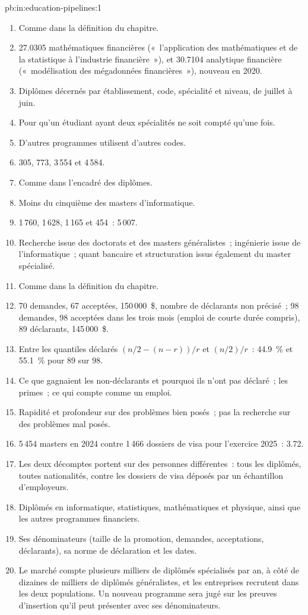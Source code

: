 \begin{solution}{pb:in:education-pipelines:1}
\begin{enumerate}
\item Comme dans la définition du chapitre.
\item 27.0305 mathématiques financières («~l'application des mathématiques et de la statistique à l'industrie financière~»), et
30.7104 analytique financière («~modélisation des mégadonnées financières~»), nouveau en 2020.
\item Diplômes décernés par établissement, code, spécialité et niveau, de juillet à juin.
\item Pour qu'un étudiant ayant deux spécialités ne soit compté qu'une fois.
\item D'autres programmes utilisent d'autres codes.
\item 305, 773, 3\,554 et 4\,584.
\item Comme dans l'encadré des diplômes.
\item Moins du cinquième des masters d'informatique.
\item 1\,760, 1\,628, 1\,165 et 454~: 5\,007.
\item Recherche issue des doctorats et des masters généralistes~; ingénierie issue de l'informatique~; quant bancaire et
structuration issus également du master spécialisé.
\item Comme dans la définition du chapitre.
\item 70 demandes, 67 acceptées, 150\,000~\$, nombre de déclarants non précisé~; 98 demandes, 98 acceptées dans les trois
mois (emploi de courte durée compris), 89 déclarants, 145\,000~\$.
\item Entre les quantiles déclarés $(n/2-(n-r))/r$ et $(n/2)/r$~: 44.9~\% et 55.1~\% pour 89 sur 98.
\item Ce que gagnaient les non-déclarants et pourquoi ils n'ont pas déclaré~; les primes~; ce qui compte comme un emploi.
\item Rapidité et profondeur sur des problèmes bien posés~; pas la recherche sur des problèmes mal posés.
\item 5\,454 masters en 2024 contre 1\,466 dossiers de visa pour l'exercice 2025~: 3.72.
\item Les deux décomptes portent sur des personnes différentes~: tous les diplômés, toutes nationalités, contre les dossiers
de visa déposés par un échantillon d'employeurs.
\item Diplômés en informatique, statistiques, mathématiques et physique, ainsi que les autres programmes financiers.
\item Ses dénominateurs (taille de la promotion, demandes, acceptations, déclarants), sa norme de déclaration et les dates.
\item Le marché compte plusieurs milliers de diplômés spécialisés par an, à côté de dizaines de milliers de diplômés généralistes, et
les entreprises recrutent dans les deux populations. Un nouveau programme sera jugé sur les preuves d'insertion qu'il peut présenter avec ses dénominateurs.
\end{enumerate}
\end{solution}

